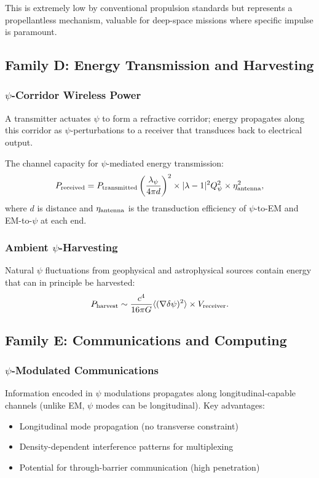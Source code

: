 \documentclass[aps,prd,twocolumn,superscriptaddress,floatfix,nofootinbib]{revtex4-2}
\newcommand{\lam}{\lambda}
\begin{document}
This is extremely low by conventional propulsion standards but
represents a propellantless mechanism, valuable for deep-space missions
where specific impulse is paramount.

\subsection{Family D: Energy Transmission and Harvesting}

\subsubsection{$\psi$-Corridor Wireless Power}

A transmitter actuates $\psi$ to form a refractive corridor; energy
propagates along this corridor as $\psi$-perturbations to a receiver
that transduces back to electrical output.

The channel capacity for $\psi$-mediated energy transmission:
\begin{equation}
P_{\rm received} = P_{\rm transmitted}\left(\frac{\lambda_\psi}{4\pi d}\right)^2
\times |\lam-1|^2 Q_\psi^2 \times \eta_{\rm antenna}^2,
\end{equation}
where $d$ is distance and $\eta_{\rm antenna}$ is the transduction
efficiency of $\psi$-to-EM and EM-to-$\psi$ at each end.

\subsubsection{Ambient $\psi$-Harvesting}

Natural $\psi$ fluctuations from geophysical and astrophysical sources
contain energy that can in principle be harvested:
\begin{equation}
P_{\rm harvest} \sim \frac{c^4}{16\pi G}\langle(\nabla\delta\psi)^2\rangle
\times V_{\rm receiver}.
\end{equation}

\subsection{Family E: Communications and Computing}

\subsubsection{$\psi$-Modulated Communications}

Information encoded in $\psi$ modulations propagates along
longitudinal-capable channels (unlike EM, $\psi$ modes can be
longitudinal). Key advantages:
\begin{itemize}[nosep]
\item Longitudinal mode propagation (no transverse constraint)
\item Density-dependent interference patterns for multiplexing
\item Potential for through-barrier communication (high penetration)
\end{itemize}
\end{document}
